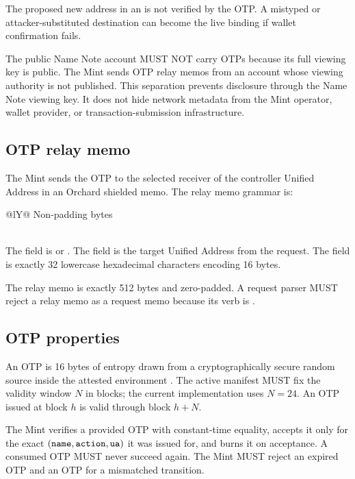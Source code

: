 The proposed new address in an  is not verified by the OTP.
A mistyped or attacker-substituted destination can become the live binding if wallet confirmation fails.

The public Name Note account MUST NOT carry OTPs because its full viewing key is public.
The Mint sends OTP relay memos from an account whose viewing authority is not published.
This separation prevents disclosure through the Name Note viewing key.
It does not hide network metadata from the Mint operator, wallet provider, or transaction-submission infrastructure.

\subsection{OTP relay memo}

The Mint sends the OTP to the selected receiver of the controller Unified Address in an Orchard shielded memo.
The relay memo grammar is:

\begin{center}
\begin{tabularx}{\textwidth}{@{}lY@{}}
\toprule
Non-padding bytes \\
\midrule
{} \\
\bottomrule
\end{tabularx}
\end{center}

The  field is  or .
The  field is the target Unified Address from the request.
The  field is exactly 32 lowercase hexadecimal characters encoding 16 bytes.

The relay memo is exactly 512 bytes and zero-padded.
A request parser MUST reject a relay memo as a request memo because its verb is .

\subsection{OTP properties}

An OTP is 16 bytes of entropy drawn from a cryptographically secure random source inside the attested environment \cite{zns-mint}.
The active manifest MUST fix the validity window \(N\) in blocks; the current implementation uses \(N = 24\).
An OTP issued at block \(h\) is valid through block \(h + N\).

The Mint verifies a provided OTP with constant-time equality, accepts it only for the exact \((\texttt{name}, \texttt{action}, \texttt{ua})\) it was issued for, and burns it on acceptance.
A consumed OTP MUST never succeed again.
The Mint MUST reject an expired OTP and an OTP for a mismatched transition.


